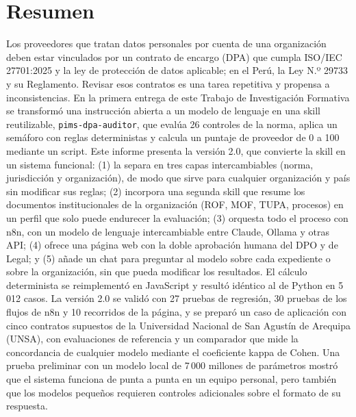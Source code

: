 \documentclass[12pt,letterpaper]{article}
\begin{document}
\setcounter{page}{2}

\section*{Resumen}

\noindent Los proveedores que tratan datos personales por cuenta de una organización deben estar vinculados por un contrato de encargo (DPA) que cumpla ISO/IEC 27701:2025 y la ley de protección de datos aplicable; en el Perú, la Ley N.º 29733 y su Reglamento. Revisar esos contratos es una tarea repetitiva y propensa a inconsistencias. En la primera entrega de este Trabajo de Investigación Formativa se transformó una instrucción abierta a un modelo de lenguaje en una skill reutilizable, \texttt{pims-dpa-auditor}, que evalúa 26 controles de la norma, aplica un semáforo con reglas deterministas y calcula un puntaje de proveedor de 0 a 100 mediante un script. Este informe presenta la versión 2.0, que convierte la skill en un sistema funcional: (1) la separa en tres capas intercambiables (norma, jurisdicción y organización), de modo que sirve para cualquier organización y país sin modificar sus reglas; (2) incorpora una segunda skill que resume los documentos institucionales de la organización (ROF, MOF, TUPA, procesos) en un perfil que solo puede endurecer la evaluación; (3) orquesta todo el proceso con n8n, con un modelo de lenguaje intercambiable entre Claude, Ollama y otras API; (4) ofrece una página web con la doble aprobación humana del DPO y de Legal; y (5) añade un chat para preguntar al modelo sobre cada expediente o sobre la organización, sin que pueda modificar los resultados. El cálculo determinista se reimplementó en JavaScript y resultó idéntico al de Python en 5\,012 casos. La versión 2.0 se validó con 27 pruebas de regresión, 30 pruebas de los flujos de n8n y 10 recorridos de la página, y se preparó un caso de aplicación con cinco contratos supuestos de la Universidad Nacional de San Agustín de Arequipa (UNSA), con evaluaciones de referencia y un comparador que mide la concordancia de cualquier modelo mediante el coeficiente kappa de Cohen. Una prueba preliminar con un modelo local de 7\,000 millones de parámetros mostró que el sistema funciona de punta a punta en un equipo personal, pero también que los modelos pequeños requieren controles adicionales sobre el formato de su respuesta.
\end{document}
